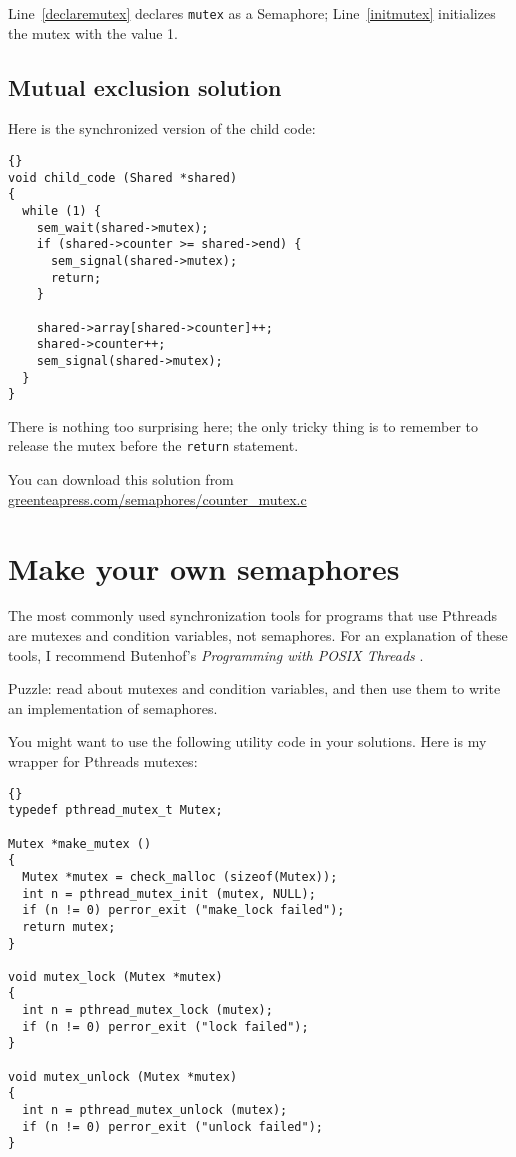 \documentclass{book}
\newcommand{\clearemptydoublepage}{\newpage\cleardoublepage}
\begin{document}
Line~\ref{declaremutex} declares {\tt mutex} as a Semaphore;
Line~\ref{initmutex} initializes the mutex with the value 1.


\clearemptydoublepage
\subsection{Mutual exclusion solution}

Here is the synchronized version of the child code:

\begin{lstlisting}[title={}]{}
void child_code (Shared *shared)
{
  while (1) {
    sem_wait(shared->mutex);
    if (shared->counter >= shared->end) {
      sem_signal(shared->mutex);
      return;
    }

    shared->array[shared->counter]++;
    shared->counter++;
    sem_signal(shared->mutex);
  }
}
\end{lstlisting}

There is nothing too surprising here; the only tricky thing
is to remember to release the mutex before the {\tt return}
statement.

You can download this solution from 
\url{greenteapress.com/semaphores/counter_mutex.c}


\clearemptydoublepage
\section{Make your own semaphores}
\label{makeyourown}

The most commonly used synchronization tools for programs that use
Pthreads are mutexes and condition variables, not semaphores.  For an
explanation of these tools, I recommend Butenhof's {\em Programming
with POSIX Threads} \cite{butenhof}.

Puzzle: read about mutexes and condition variables, and then
use them to write an implementation of semaphores.

You might want to use the following utility code in your solutions.
Here is my wrapper for Pthreads mutexes:

\begin{lstlisting}[title={}]{}
typedef pthread_mutex_t Mutex;

Mutex *make_mutex ()
{
  Mutex *mutex = check_malloc (sizeof(Mutex));
  int n = pthread_mutex_init (mutex, NULL);
  if (n != 0) perror_exit ("make_lock failed"); 
  return mutex;
}

void mutex_lock (Mutex *mutex)
{
  int n = pthread_mutex_lock (mutex);
  if (n != 0) perror_exit ("lock failed");
}

void mutex_unlock (Mutex *mutex)
{
  int n = pthread_mutex_unlock (mutex);
  if (n != 0) perror_exit ("unlock failed");
}
\end{lstlisting}
\end{document}

